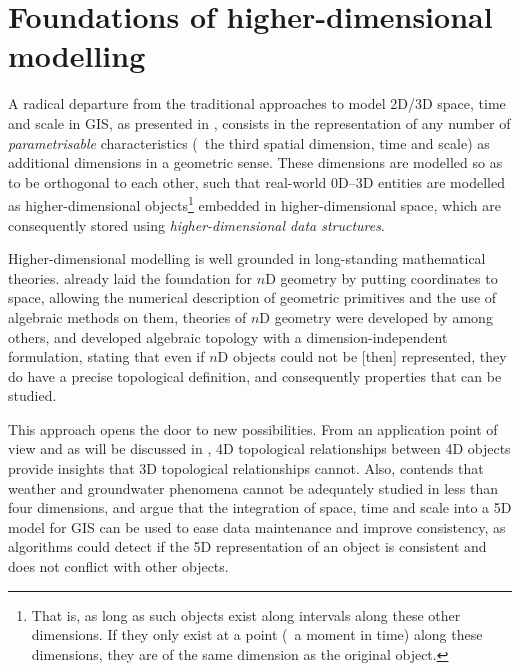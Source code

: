 \section{Foundations of higher-dimensional modelling}
\label{se:nd-modelling-foundations}


A radical departure from the traditional approaches to model 2D/3D space, time and scale in GIS, as presented in , consists in the representation of any number of \emph{parametrisable} characteristics (\eg\ the third spatial dimension, time and scale) as additional dimensions in a geometric sense.
These dimensions are modelled so as to be orthogonal to each other, such that real-world 0D--3D entities are modelled as higher-dimensional objects\footnote{That is, as long as such objects exist along intervals along these other dimensions. If they only exist at a point (\eg\ a moment in time) along these dimensions, they are of the same dimension as the original object.} embedded in higher-dimensional space, which are consequently stored using \emph{higher-dimensional data structures}.


Higher-dimensional modelling is well grounded in long-standing mathematical theories.
\citet{Descartes37} already laid the foundation for $n$D geometry by putting coordinates to space, allowing the numerical description of geometric primitives and the use of algebraic methods on them, theories of $n$D geometry were developed by \citet{Riemann68} among others, and \citet{Poincare95} developed algebraic topology with a dimension-independent formulation, stating that even if $n$D objects could not be [then] represented, they do have a precise topological definition, and consequently properties that can be studied.


This approach opens the door to new possibilities.
From an application point of view and as will be discussed in , 4D topological relationships between 4D objects provide insights that 3D topological relationships cannot.
Also, \citet{McKenzie01} contends that weather and groundwater phenomena cannot be adequately studied in less than four dimensions, and \citet{vanOosterom10} argue that the integration of space, time and scale into a 5D model for GIS can be used to ease data maintenance and improve consistency, as algorithms could detect if the 5D representation of an object is consistent and does not conflict with other objects.

